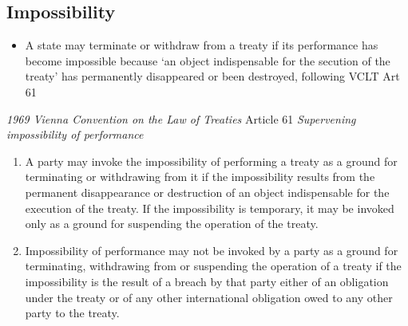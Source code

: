 \subsection{Impossibility}
\begin{itemize}
    \item A state may terminate or withdraw from a treaty if its performance has become impossible because `an object indispensable for the secution of the treaty' has permanently disappeared or been destroyed, following VCLT Art 61
\end{itemize}
\begin{conventiondetails}{\textit{1969 Vienna Convention on the Law of Treaties} Article 61}
    \flushleft
    \textit{Supervening impossibility of performance}

    \begin{enumerate}
        \item A party may invoke the impossibility of performing a treaty as a ground for terminating or withdrawing from it if the impossibility results from the permanent disappearance or destruction of an object indispensable for the execution of the treaty. If the impossibility is temporary, it may be invoked only as a ground for suspending the operation of the treaty. 
        \item Impossibility of performance may not be invoked by a party as a ground for terminating, withdrawing from or suspending the operation of a treaty if the impossibility is the result of a breach by that party either of an obligation under the treaty or of any other international obligation owed to any other party to the treaty. 
    \end{enumerate}
\end{conventiondetails}

